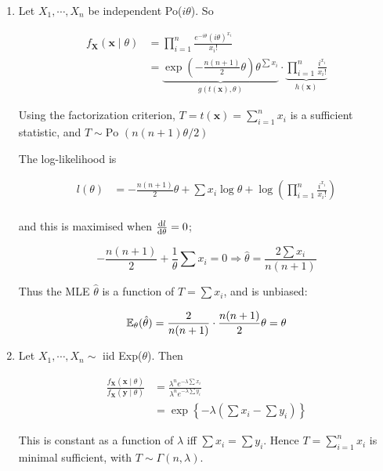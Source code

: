 \documentclass[a4paper]{article}
\begin{document}
\begin{enumerate}[label = (\alph*)]
	\item Let $ X_{1},\cdots,X_{n} $ be independent Po($ i\theta $). So
	
	\begin{align*}
	f_{\mathbf{X}}(\mathbf{x} \; | \; \theta) & =  \prod_{i=1}^{n} \frac{e^{-i\theta}(i \theta)^{x_{i}}}{x_{i}!} \\
	& = \underbrace{\exp  \left(- \frac{n(n+1)}{2} \theta   \right)  \theta^{\sum x_{i}}}_{g(t(\mathbf{x}),\theta)} \cdot \underbrace{\prod_{i=1}^{n} \frac{i^{x_{i}}}{x_{i}!}}_{h(\mathbf{x})}
	\end{align*}
	
	Using the factorization criterion, $ T = t(\mathbf{x}) = \sum_{i=1}^{n} x_{i} $ is a sufficient statistic, and $ T \sim \text{Po }(n(n+1)\theta/2) $
	
	The log-likelihood is 
	
	\begin{align*}
	l(\theta) &  = - \frac{n(n+1)}{2} \theta   + \sum x_{i} \log \theta + \log \left(  \prod_{i=1}^{n} \frac{i^{x_{i}}}{x_{i}!} \right)    \\
	\end{align*}
	
	and this is maximised when $ \frac{\mathrm{d} l}{\mathrm{d} \theta} = 0 $;
	
	\[  - \frac{n(n+1)}{2}  + \frac{1}{\theta} \sum x_{i}  = 0 \Rightarrow \hat{\theta} = \frac{2 \sum x_{i}}{n(n+1)}   \]
	
	Thus the MLE $ \hat{\theta} $ is a function of $ T = \sum x_{i} $, and is unbiased:
	
	\[ \mathbb{E}_{\theta}(\hat{\theta}) = \frac{2}{n(n+1)} \cdot \frac{n(n+1)}{2} \theta = \theta  \]
	
	\item Let $ X_{1},\cdots,X_{n} \sim $ iid Exp($ \theta $). Then
	
	
	\begin{align*}
	\frac{	f_{\mathbf{X}}(\mathbf{x} \; | \; \theta)}{	f_{\mathbf{X}}(\mathbf{y} \; | \; \theta)}& = \frac{\lambda^{n} e^{-\lambda \sum x_{i} }}{\lambda^{n} e^{-\lambda \sum y_{i} }} \\
	& = \exp\left\{ - \lambda \left( \sum x_{i} - \sum y_{i}  \right)   \right\} 
	\end{align*}
	
	This is constant as a function of $ \lambda $ iff $  \sum x_{i} = \sum y_{i} $. Hence $ T = \sum_{i=1}^{n} x_{i} $ is minimal sufficient, with $ T \sim \Gamma(n,\lambda) $. 
	

\end{enumerate}
\end{document}
